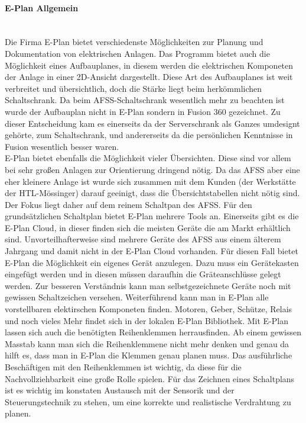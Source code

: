     \paragraph{E-Plan Allgemein}\mbox{}\\
    Die Firma E-Plan bietet verschiedenste Möglichkeiten zur Planung und Dokumentation von elektrischen Anlagen. Das Programm bietet auch die Möglichkeit eines Aufbauplanes, in diesem werden die elektrischen Komponeten der Anlage in einer 2D-Ansicht dargestellt. Diese Art des Aufbauplanes ist weit verbreitet und übersichtlich, doch die Stärke liegt beim herkömmlichen Schaltschrank. Da beim AFSS-Schaltschrank wesentlich mehr zu beachten ist wurde der Aufbauplan nicht in E-Plan sondern in Fusion 360 gezeichnet. Zu dieser Entscheidung kam es einerseits da der Serverschrank als Ganzes umdesignt gehörte, zum Schaltschrank, und andererseits da die persönlichen Kenntnisse in Fusion wesentlich besser waren.\\
    E-Plan bietet ebenfalls die Möglichkeit vieler Übersichten. Diese sind vor allem bei sehr großen Anlagen zur Orientierung dringend nötig. Da das AFSS aber eine eher kleinere Anlage ist wurde sich zusammen mit dem Kunden (der Werkstätte der HTL-Mössinger) darauf geeinigt, dass die Übersichtstabellen nicht nötig sind.\\
    Der Fokus liegt daher auf dem reinem Schaltpan des AFSS. Für den grundsätzlichen Schaltplan bietet E-Plan mehrere Tools an. Einerseits gibt es die E-Plan Cloud, in dieser finden sich die meisten Geräte die am Markt erhältlich sind. Unvorteilhafterweise sind mehrere Geräte des AFSS aus einem älterem Jahrgang und damit nicht in der E-Plan Cloud vorhanden. Für diesen Fall bietet E-Plan die Möglichkeit ein eigenes Gerät anzulegen. Dazu muss ein Gerätekasten eingefügt werden und in diesen müssen daraufhin die Gräteanschlüsse gelegt werden. Zur besseren Verständnis kann man selbstgezeichnete Geräte noch mit gewissen Schaltzeichen versehen. Weiterführend kann man in E-Plan alle vorstellbaren elektirschen Komponeten finden. Motoren, Geber, Schütze, Relais und noch vieles Mehr findet sich in der lokalen E-Plan Bibliothek. Mit E-Plan lassen sich auch die benötigten Reihenklemmen herrausfinden. Ab einem gewissen Masstab kann man sich die Reihenklemmene nicht mehr denken und genau da hilft es, dass man in E-Plan die Klemmen genau planen muss. Das ausführliche Beschäftigen mit den Reihenklemmen ist wichtig, da diese für die Nachvollziehbarkeit eine große Rolle spielen. Für das Zeichnen eines Schaltplans ist es wichtig im konstaten Austausch mit der Sensorik und der Steuerungstechnik zu stehen, um eine korrekte und realistische Verdrahtung zu planen.\\
